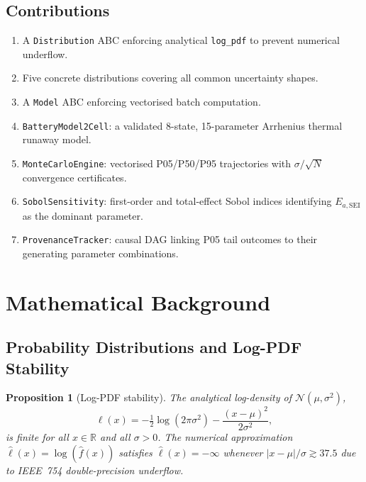 \documentclass[12pt,a4paper]{article}
\theoremstyle{plain}
\newtheorem{proposition}{Proposition}[section]
\theoremstyle{definition}
\theoremstyle{remark}
\begin{document}
\subsection{Contributions}

\begin{enumerate}
  \item A \texttt{Distribution} ABC enforcing analytical \texttt{log\_pdf}
    to prevent numerical underflow.
  \item Five concrete distributions covering all common uncertainty shapes.
  \item A \texttt{Model} ABC enforcing vectorised batch computation.
  \item \texttt{BatteryModel2Cell}: a validated 8-state, 15-parameter
    Arrhenius thermal runaway model.
  \item \texttt{MonteCarloEngine}: vectorised P05/P50/P95 trajectories
    with $\sigma/\sqrt{N}$ convergence certificates.
  \item \texttt{SobolSensitivity}: first-order and total-effect Sobol
    indices identifying $E_{a,\text{SEI}}$ as the dominant parameter.
  \item \texttt{ProvenanceTracker}: causal DAG linking P05 tail outcomes
    to their generating parameter combinations.
\end{enumerate}

\section{Mathematical Background}

\subsection{Probability Distributions and Log-PDF Stability}

\begin{proposition}[Log-PDF stability]
\label{prop:logpdf}
The analytical log-density of $\mathcal{N}(\mu, \sigma^2)$,
\[
  \ell(x) = -\tfrac{1}{2}\log(2\pi\sigma^2)
            - \frac{(x-\mu)^2}{2\sigma^2},
\]
is finite for all $x \in \mathbb{R}$ and all $\sigma > 0$.
The numerical approximation $\hat\ell(x) = \log(\hat f(x))$ satisfies
$\hat\ell(x) = -\infty$ whenever $|x-\mu|/\sigma \gtrsim 37.5$
due to IEEE~754 double-precision underflow.
\end{proposition}
\end{document}
